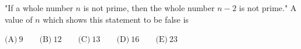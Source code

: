 "If a whole number $n$ is not prime, then the whole number $n-2$ is not prime." A value of $n$ which shows this statement to be false is



$\text{(A)}\ 9 \qquad \text{(B)}\ 12 \qquad \text{(C)}\ 13 \qquad \text{(D)}\ 16 \qquad \text{(E)}\ 23$
